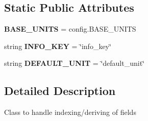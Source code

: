 \subsection*{Static Public Attributes}
\begin{DoxyCompactItemize}
\item 
\hypertarget{classseren3_1_1core_1_1serensource_1_1DerivedDataset_a6f800529352abc5a056f45f4aa97bdb0}{
{\bfseries BASE\_\-UNITS} = config.BASE\_\-UNITS}
\label{classseren3_1_1core_1_1serensource_1_1DerivedDataset_a6f800529352abc5a056f45f4aa97bdb0}

\item 
\hypertarget{classseren3_1_1core_1_1serensource_1_1DerivedDataset_adab52c9095283c118317dd278f637145}{
string {\bfseries INFO\_\-KEY} = \char`\"{}info\_\-key\char`\"{}}
\label{classseren3_1_1core_1_1serensource_1_1DerivedDataset_adab52c9095283c118317dd278f637145}

\item 
\hypertarget{classseren3_1_1core_1_1serensource_1_1DerivedDataset_a20a08b26b9a05f13bb53d6b6f2b5bf4f}{
string {\bfseries DEFAULT\_\-UNIT} = \char`\"{}default\_\-unit\char`\"{}}
\label{classseren3_1_1core_1_1serensource_1_1DerivedDataset_a20a08b26b9a05f13bb53d6b6f2b5bf4f}

\end{DoxyCompactItemize}


\subsection{Detailed Description}
\begin{DoxyVerb}
Class to handle indexing/deriving of fields
\end{DoxyVerb}
 

